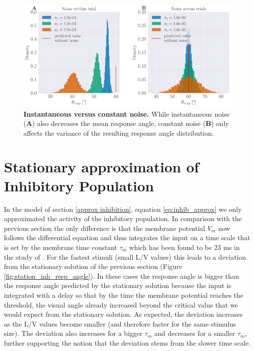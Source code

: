     \begin{figure}[H]
    	\begin{center}
			\includegraphics[width=\textwidth, height=0.25\textheight]{figure_static_vs_dynamic_noise.pdf}
    	\end{center}
    	\caption{\textbf{Instantaneous versus constant noise.} While instantaneous noise (\textbf{A}) also decreases the mean response angle, constant noise (\textbf{B}) only affects the variance of the resulting response angle distribution.}
    	\label{fig:static_vs_dynamic_noise}
    \end{figure}

    \section{Stationary approximation of Inhibitory Population}
    In the model of section \ref{approx inhibition}, equation \ref{eq:inhib_approx} we only approximated the activity of the inhibitory population.
    In comparison with the previous section the only difference is that the membrane potential $V_{m}$ now follows the differential equation and thus integrates the input on a time scale that is set by the membrane time constant $\tau_m$ which has been found to be 23 ms in the study of \cite{Koyama2016}.
    For the fastest stimuli (small L/V values) this leads to a deviation from the stationary solution of the previous section (Figure \ref{fig:station_inh_resp_angle}).
    In these cases the response angle is bigger than the response angle predicted by the stationary solution because the input is integrated with a delay so that by the time the membrane potential reaches the threshold, the visual angle already increased beyond the critical value that we would expect from the stationary solution.
    As expected, the deviation increases as the L/V values become smaller (and therefore faster for the same stimulus size).
    The deviation also increases for a bigger $\tau_m$ and decreases for a smaller $\tau_m$, further supporting the notion that the deviation stems from the slower time scale.
        

